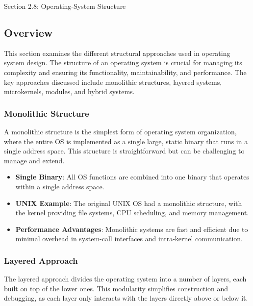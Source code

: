 \begin{notes}{Section 2.8: Operating-System Structure}
    \subsection*{Overview}

    This section examines the different structural approaches used in operating system design. The structure of an operating system is crucial for managing its complexity and ensuring its functionality, 
    maintainability, and performance. The key approaches discussed include monolithic structures, layered systems, microkernels, modules, and hybrid systems.
    
    \subsubsection*{Monolithic Structure}
    
    A monolithic structure is the simplest form of operating system organization, where the entire OS is implemented as a single large, static binary that runs in a single address space. This structure 
    is straightforward but can be challenging to manage and extend.
    
    \begin{highlight}
    
    \begin{itemize}
        \item \textbf{Single Binary}: All OS functions are combined into one binary that operates within a single address space.
        \item \textbf{UNIX Example}: The original UNIX OS had a monolithic structure, with the kernel providing file systems, CPU scheduling, and memory management.
        \item \textbf{Performance Advantages}: Monolithic systems are fast and efficient due to minimal overhead in system-call interfaces and intra-kernel communication.
    \end{itemize}
    
    \end{highlight}
    
    \subsubsection*{Layered Approach}
    
    The layered approach divides the operating system into a number of layers, each built on top of the lower ones. This modularity simplifies construction and debugging, as each layer only interacts 
    with the layers directly above or below it.
    

\end{notes}
